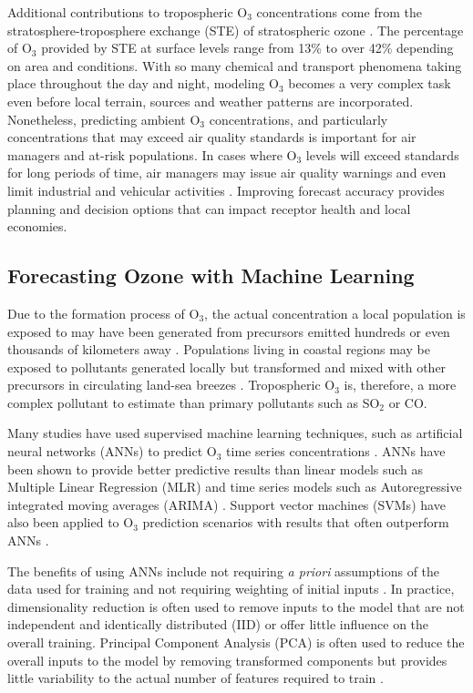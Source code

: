 Additional contributions to tropospheric O$_{3}$ concentrations come from the stratosphere-troposphere exchange (STE) of stratospheric ozone \citep{Tarasick2008}. The percentage of O$_{3}$ provided by STE at surface levels range from 13\% \citep{Cooper2006} to over 42\% \citep{Lelieveld2000} depending on area and conditions. With so many chemical and transport phenomena taking place throughout the day and night, modeling O$_{3}$ becomes a very complex task even before local terrain, sources and weather patterns are incorporated. Nonetheless, predicting ambient O$_{3}$ concentrations, and particularly concentrations that may exceed air quality standards is important for air managers and at-risk populations.  In cases where O$_{3}$ levels will exceed standards for long periods of time, air managers may issue air quality warnings and even limit industrial and vehicular activities \citep{Kuhlbusch2014, Welch2005}. Improving forecast accuracy provides planning and decision options that can impact receptor health and local economies.

\subsection{Forecasting Ozone with Machine Learning}

Due to the formation process of O$_{3}$, the actual concentration a local population is exposed to may have been generated from precursors emitted hundreds or even thousands of kilometers away \citep{Glavas2011}. Populations living in coastal regions may be exposed to pollutants generated locally but transformed and mixed with other precursors in circulating land-sea breezes \citep{Freeman2017a}. Tropospheric O$_{3}$ is, therefore, a more complex pollutant to estimate than primary pollutants such as SO$_{2}$ or CO.

Many studies have used supervised machine learning techniques, such as artificial neural networks (ANNs) to predict O$_{3}$ time series concentrations \citep{Comrie1997, Dorling2003, Ettouney2009a, Kurt2008, Biancofiore2017}. ANNs have been shown to provide better predictive results than linear models such as Multiple Linear Regression (MLR) and time series models such as Autoregressive integrated moving averages (ARIMA) \citep{Gardner1998, Prybutok2000}. Support vector machines (SVMs) have also been applied to O$_{3}$ prediction scenarios with results that often outperform ANNs \citep{Luna2014, Papaleonidas2013, Singh2013}. 

The benefits of using ANNs include not requiring \textit{a priori} assumptions of the data used for training and not requiring weighting of initial inputs \citep{Gardner1998}. In practice, dimensionality reduction is often used to remove inputs to the model that are not independent and identically distributed (IID) or offer little influence on the overall training. Principal Component Analysis (PCA) is often used to reduce the overall inputs to the model by removing transformed components but provides little variability to the actual number of features required to train \citep{Singh2013, Wang2015a}.


